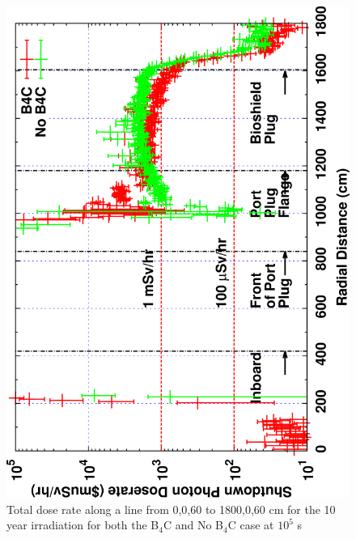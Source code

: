 \documentclass[12pt]{article}
\begin{document}
\begin{figure}[ht!]
\centering
\includegraphics[clip,scale=0.12,angle=-90]{../plots/photon_lineout/comp/10yr_dc1.png}
\caption{Total dose rate along a line from 0,0,60 to 1800,0,60 cm for the 10 year irradiation
for both the B$_4$C and No B$_4$C case at $10^5$ s}
\label{fig:photons_10y_dc1_dose}
\end{figure}
\newpage
\end{document}
